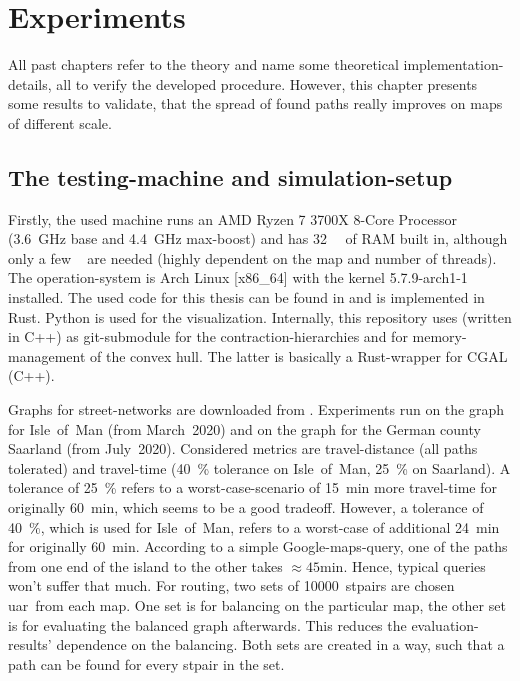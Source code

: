 \chapter{Experiments}
\label{chap:experiments}

All past chapters refer to the theory and name some theoretical implementation-details, all to verify the developed procedure.
However, this chapter presents some results to validate, that the spread of found paths really improves on maps of different scale.

\section{The testing-machine and simulation-setup}

    Firstly, the used machine runs an AMD Ryzen 7 3700X 8-Core Processor (\si{\num{3.6} \giga\hertz} base and \si{\num{4.4} \giga\hertz} max-boost) and has \si{\num{32} \giga\byte} of RAM built in, although only a few \si{\giga\byte} are needed (highly dependent on the map and number of threads).
    The operation-system is Arch Linux [x86\_64] with the kernel 5.7.9-arch1-1 installed.
    The used code for this thesis can be found in \cite{github:dominicparga/osmgraphing} and is implemented in Rust.
    Python is used for the visualization.
    Internally, this repository uses \cite{github:lesstat/multi-ch-constructor} (written in C++) as git-submodule for the \gls{contraction-hierarchies} and \cite{github:lesstat/nd-triangulation} for memory-management of the convex hull.
    The latter is basically a Rust-wrapper for CGAL (C++).

    Graphs for street-networks are downloaded from \cite{osm}.
    Experiments run on the graph for Isle~of~Man (from March~2020) and on the graph for the German county Saarland (from July~2020).
    Considered \glspl{metric} are travel-distance (all paths tolerated) and travel-time (\si{40 \percent} tolerance on Isle~of~Man, \si{25 \percent} on Saarland).
    A tolerance of \si{25 \percent} refers to a worst-case-scenario of \si{15 \minute} more travel-time for originally \si{60 \minute}, which seems to be a good tradeoff.
    However, a tolerance of \si{40 \percent}, which is used for Isle~of~Man, refers to a worst-case of additional \si{24 \minute} for originally \si{60 \minute}.
    According to a simple Google-maps-query, one of the paths from one end of the island to the other takes $\approx \si{45 \minute}$.
    Hence, typical queries won't suffer that much.
    For routing, two sets of \num{10000}~\glspl{stpair} are chosen \gls{uar}\ from each map.
    One set is for \gls{balancing} on the particular map, the other set is for evaluating the balanced graph afterwards.
    This reduces the evaluation-results' dependence on the \gls{balancing}.
    Both sets are created in a way, such that a path can be found for every \gls{stpair} in the set.

